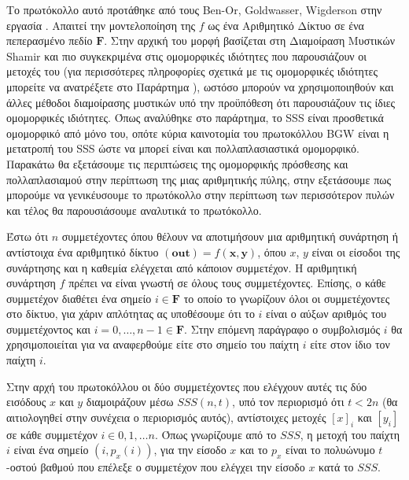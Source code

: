 Το πρωτόκολλο αυτό προτάθηκε από τους Ben-Or, Goldwasser, Wigderson στην εργασία \cite{BenOr1988CompletenessTF}. Απαιτεί την μοντελοποίηση της $f$ ως ένα Αριθμητικό Δίκτυο σε ένα πεπερασμένο πεδίο $\mathbf{F}$. Στην αρχική του μορφή βασίζεται στη Διαμοίραση Μυστικών Shamir και πιο συγκεκριμένα στις ομομορφικές ιδιότητες που παρουσιάζουν οι μετοχές του (για περισσότερες πληροφορίες σχετικά με τις ομομορφικές ιδιότητες μπορείτε να ανατρέξετε στο Παράρτημα ), ωστόσο μπορούν να χρησιμοποιηθούν και άλλες μέθοδοι διαμοίρασης μυστικών υπό την προϋπόθεση ότι παρουσιάζουν τις ίδιες ομομορφικές ιδιότητες. Όπως αναλύθηκε στο παράρτημα, το SSS είναι προσθετικά ομομορφικό από μόνο του, οπότε κύρια καινοτομία του πρωτοκόλλου BGW είναι η μετατροπή του SSS ώστε να μπορεί είναι και πολλαπλασιαστικά ομομορφικό. Παρακάτω θα εξετάσουμε τις περιπτώσεις της ομομορφικής πρόσθεσης και πολλαπλασιαμού στην περίπτωση της μιας αριθμητικής πύλης, στην εξετάσουμε πως μπορούμε να γενικέυσουμε το πρωτόκολλο στην περίπτωση των περισσότερον πυλών και τέλος θα παρουσιάσουμε αναλυτικά το πρωτόκολλο.

Έστω ότι $n$ συμμετέχοντες όπου θέλουν να αποτιμήσουν μια αριθμητική συνάρτηση ή αντίστοιχα ένα αριθμητικό δίκτυο $(\mathbf{out}) = f(\mathbf{x}, \mathbf{y})$, όπου $x$, $y$ είναι οι είσοδοι της συνάρτησης και η καθεμία ελέγχεται από κάποιον συμμετέχον. Η αριθμητική συνάρτηση $f$ πρέπει να είναι γνωστή σε όλους τους συμμετέχοντες. Επίσης, ο κάθε συμμετέχον διαθέτει ένα σημείο $i \in \mathbf{F}$ το οποίο το γνωρίζουν όλοι οι συμμετέχοντες στο δίκτυο, για χάριν απλότητας ας υποθέσουμε ότι το $i$ είναι ο αύξων αριθμός του συμμετέχοντος και $i = 0, \ldots, n-1 \in \mathbf{F}$. Στην επόμενη παράγραφο ο συμβολισμός $i$ θα χρησιμοποιείται για να αναφερθούμε είτε στο σημείο του παίχτη $i$ είτε στον ίδιο τον παίχτη $i$.

Στην αρχή του πρωτοκόλλου οι δύο συμμετέχοντες που ελέγχουν αυτές τις δύο εισόδους $x$ και $y$ διαμοιράζουν μέσω $SSS(n,t)$, υπό τον περιορισμό ότι $t < 2n$ (θα αιτιολογηθεί στην συνέχεια ο περιορισμός αυτός), αντίστοιχες μετοχές $[x]_i$ και $[y_i]$ σε κάθε συμμετέχον $i \in 0, 1, \ldots n$. Όπως γνωρίζουμε από το $SSS$, η μετοχή του παίχτη $i$ είναι ένα σημείο $(i, p_x(i))$, για την είσοδο $x$ και το $p_x$ είναι το πολυώνυμο $t$-οστού βαθμού που επέλεξε ο συμμετέχον που ελέγχει την είσοδο $x$ κατά το $SSS$.


